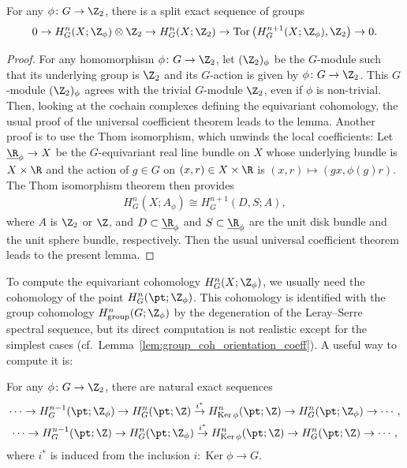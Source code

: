 \begin{lem} \label{lem:Z2_coefficient}
For any $\phi \colon G \to \Z_2$, there is a split exact sequence of groups
\begin{gather*}
0 \to H^n_G(X; \Z_\phi) \otimes \Z_2 \to H^n_G(X; \Z_2) \to \operatorname{Tor}\big(H^{n+1}_G(X; \Z_\phi), \Z_2\big) \to 0.
\end{gather*}
\end{lem}

\begin{proof}
For any homomorphism $\phi \colon G \to \Z_2$, let $(\Z_2)_\phi$ be the $G$-module such that its underlying group is $\Z_2$ and its $G$-action is given by $\phi \colon G \to \Z_2$. This $G$-module $(\Z_2)_\phi$ agrees with the trivial $G$-module $\Z_2$, even if $\phi$ is non-trivial. Then, looking at the cochain complexes def\/ining the equivariant cohomology, the usual proof of the universal coef\/f\/icient theorem leads to the lemma. Another proof is to use the Thom isomorphism, which unwinds the local coef\/f\/icients: Let $\underline{\R}_{\phi} \to X$ be the $G$-equivariant real line bundle on $X$ whose underlying bundle is $X \times \R$ and the action of $g \in G$ on $(x, r) \in X \times \R$ is $(x, r) \mapsto (gx, \phi(g)r)$. The Thom isomorphism theorem then provides
\begin{gather*}
H^n_G(X; A_\phi) \cong H^{n+1}_G(D, S; A),
\end{gather*}
where $A$ is $\Z_2$ or $\Z$, and $D \subset \underline{\R}_\phi$ and $S \subset \underline{\R}_\phi$ are the unit disk bundle and the unit sphere bundle, respectively. Then the usual universal coef\/f\/icient theorem leads to the present lemma.
\end{proof}

To compute the equivariant cohomology $H^n_G(X; \Z_\phi)$, we usually need the cohomology of the point $H^n_G(\pt; \Z_\phi)$. This cohomology is identif\/ied with the group cohomology $H^n_{\mathrm{group}}(G; \Z_\phi)$ by the degeneration of the Leray--Serre spectral sequence, but its direct computation is not realistic except for the simplest cases (cf.\ Lemma~\ref{lem:group_coh_orientation_coeff}). A useful way to compute it is:

\begin{lem} \label{lem:exact_seq}
For any $\phi \colon G \to \Z_2$, there are natural exact sequences
\begin{gather*}
\cdots \to H^{n-1}_G(\pt; \Z_\phi) \to H^n_G(\pt; \Z) \overset{i^*}{\to} H^n_{\operatorname{Ker}\phi}(\pt; \Z) \to H^n_G(\pt; \Z_\phi) \to \cdots, \\
\cdots \to H^{n-1}_G(\pt; \Z) \to H^n_G(\pt; \Z_\phi) \overset{i^*}{\to} H^n_{\operatorname{Ker}\phi}(\pt; \Z) \to H^n_G(\pt; \Z) \to \cdots,
\end{gather*}
where $i^*$ is induced from the inclusion $i \colon \operatorname{Ker}\phi \to G$.
\end{lem}

